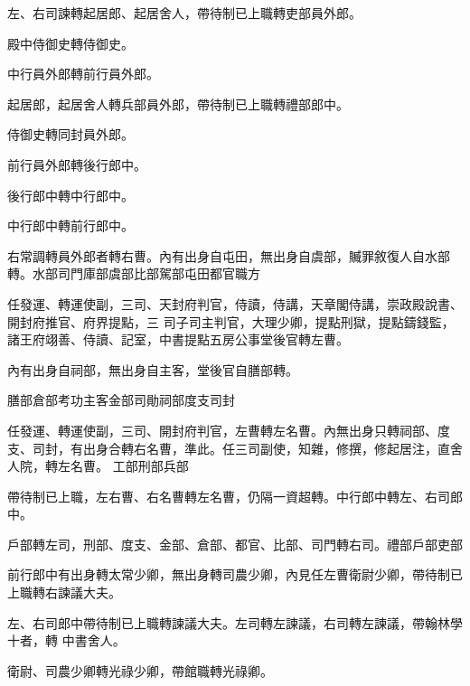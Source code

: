 \begin{pinyinscope}
 左、右司諫轉起居郎、起居舍人，帶待制已上職轉吏部員外郎。



 殿中侍御史轉侍御史。



 中行員外郎轉前行員外郎。



 起居郎，起居舍人轉兵部員外郎，帶待制已上職轉禮部郎中。



 侍御史轉同封員外郎。



 前行員外郎轉後行郎中。



 後行郎中轉中行郎中。



 中行郎中轉前行郎中。



 右常調轉員外郎者轉右曹。內有出身自屯田，無出身自虞部，贓罪敘復人自水部轉。水部司門庫部虞部比部駕部屯田都官職方



 任發運、轉運使副，三司、天封府判官，侍讀，侍講，天章閣侍講，崇政殿說書、開封府推官、府界提點，三
 司子司主判官，大理少卿，提點刑獄，提點鑄錢監，諸王府翊善、侍讀、記室，中書提點五房公事堂後官轉左曹。



 內有出身自祠部，無出身自主客，堂後官自膳部轉。



 膳部倉部考功主客金部司勛祠部度支司封



 任發運、轉運使副，三司、開封府判官，左曹轉左名曹。內無出身只轉祠部、度支、司封，有出身合轉右名曹，準此。任三司副使，知雜，修撰，修起居注，直舍人院，轉左名曹。
 工部刑部兵部



 帶待制已上職，左右曹、右名曹轉左名曹，仍隔一資超轉。中行郎中轉左、右司郎中。



 戶部轉左司，刑部、度支、金部、倉部、都官、比部、司門轉右司。禮部戶部吏部



 前行郎中有出身轉太常少卿，無出身轉司農少卿，內見任左曹衛尉少卿，帶待制已上職轉右諫議大夫。



 左、右司郎中帶待制已上職轉諫議大夫。左司轉左諫議，右司轉左諫議，帶翰林學十者，轉
 中書舍人。



 衛尉、司農少卿轉光祿少卿，帶館職轉光祿卿。




\end{pinyinscope}
